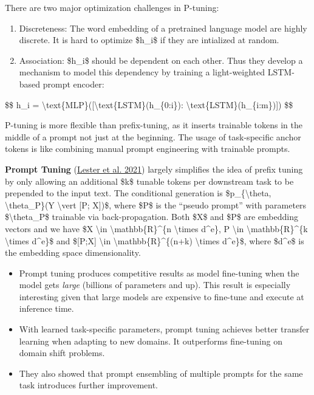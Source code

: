There are two major optimization challenges in P-tuning:

\begin{enumerate}
\tightlist
\item
  Discreteness: The word embedding of a pretrained language model are highly discrete. It is hard to optimize \$h\_i\$ if they are intialized at random.
\item
  Association: \$h\_i\$ should be dependent on each other. Thus they develop a mechanism to model this dependency by training a light-weighted LSTM-based prompt encoder:
\end{enumerate}

\$\$ h\_i = \textbackslash text\{MLP\}({[}\textbackslash text\{LSTM\}(h\_\{0:i\}): \textbackslash text\{LSTM\}(h\_\{i:m\}){]}) \$\$

P-tuning is more flexible than prefix-tuning, as it inserts trainable tokens in the middle of a prompt not just at the beginning. The usage of task-specific anchor tokens is like combining manual prompt engineering with trainable prompts.

\textbf{Prompt Tuning} (\href{https://arxiv.org/abs/2104.08691}{Lester et al. 2021}) largely simplifies the idea of prefix tuning by only allowing an additional \$k\$ tunable tokens per downstream task to be prepended to the input text. The conditional generation is \$p\_\{\textbackslash theta, \textbackslash theta\_P\}(Y \textbackslash vert {[}P; X{]})\$, where \$P\$ is the ``pseudo prompt'' with parameters \$\textbackslash theta\_P\$ trainable via back-propagation. Both \$X\$ and \$P\$ are embedding vectors and we have \$X \textbackslash in \textbackslash mathbb\{R\}\^{}\{n \textbackslash times d\^{}e\}, P \textbackslash in \textbackslash mathbb\{R\}\^{}\{k \textbackslash times d\^{}e\}\$ and \${[}P;X{]} \textbackslash in \textbackslash mathbb\{R\}\^{}\{(n+k) \textbackslash times d\^{}e\}\$, where \$d\^{}e\$ is the embedding space dimensionality.

\begin{itemize}
\tightlist
\item
  Prompt tuning produces competitive results as model fine-tuning when the model gets \emph{large} (billions of parameters and up). This result is especially interesting given that large models are expensive to fine-tune and execute at inference time.
\item
  With learned task-specific parameters, prompt tuning achieves better transfer learning when adapting to new domains. It outperforms fine-tuning on domain shift problems.
\item
  They also showed that prompt ensembling of multiple prompts for the same task introduces further improvement.
\end{itemize}

